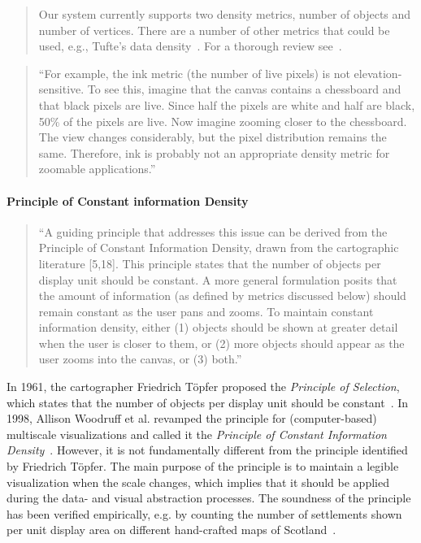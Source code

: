 \documentclass[11pt, oneside]{report}   	%
\begin{document}
\begin{quote}
Our system currently supports two density metrics, number of objects and number of vertices. There are a number of other metrics that could be used, e.g., Tufte's data density~\cite{tufte1983visual}. For a thorough review see~\cite{nickerson1994visual}.
\end{quote}

\begin{quote}
``For example, the ink metric (the number of live pixels) is not elevation-sensitive. To see this, imagine that the canvas contains a chessboard and that black pixels are live. Since half the pixels are white and half are black, 50\% of the pixels are live. Now imagine zooming closer to the chessboard. The view changes considerably, but the pixel distribution remains the same. Therefore, ink is probably not an appropriate density metric for zoomable applications.''
\end{quote}

\paragraph{Principle of Constant information Density}

\begin{quote}
``A guiding principle that addresses this issue can be derived from the Principle of Constant Information Density, drawn from the cartographic literature [5,18]. This principle states that the number of objects per display unit should be constant. A more general formulation posits that the amount of information (as defined by metrics discussed below) should remain constant as the user pans and zooms. To maintain constant information density, either (1) objects should be shown at greater detail when the user is closer to them, or (2) more objects should appear as the user zooms into the canvas, or (3) both.''
\end{quote}

In 1961, the cartographer Friedrich T\"{o}pfer proposed the \emph{Principle of Selection}, which states that the number of objects per display unit should be constant~\cite{topfer1966principles}. In 1998, Allison Woodruff et al. revamped the principle for (computer-based) multiscale visualizations and called it the \emph{Principle of Constant Information Density}~\cite{woodruff1998constant}. However, it is not fundamentally different from the principle identified by Friedrich T\"{o}pfer. The main purpose of the principle is to maintain a legible visualization when the scale changes, which implies that it should be applied during the data- and visual abstraction processes. The soundness of the principle has been verified empirically, e.g. by counting the number of settlements shown per unit display area on different hand-crafted maps of Scotland~\cite{topfer1966principles}. 
\end{document}

